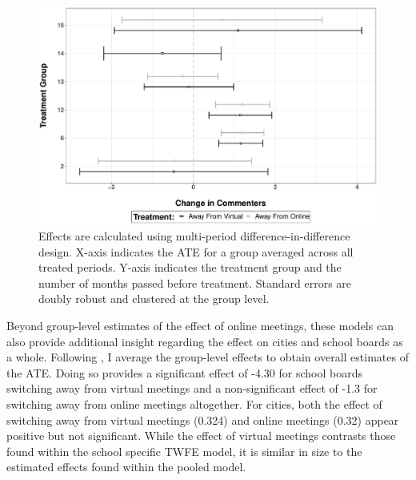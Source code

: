     \begin{figure}[H]
        \centering
         \par\medskip
        \includegraphics[scale=0.39]{Figures/CityMPDID.pdf}
        \caption[Effect of Switching Away From Accessible Meetings By City Groups]{\footnotesize{Effects are calculated using multi-period difference-in-difference design. X-axis indicates the ATE for a group averaged across all treated periods. Y-axis indicates the treatment group and the number of months passed before treatment. Standard errors are doubly robust and clustered at the group level.}}
        \label{fig:AwayCity}
    \end{figure}

    Beyond group-level estimates of the effect of online meetings, these models can also provide additional insight regarding the effect on cities and school boards as a whole. Following \citet{callawayDifferenceinDifferencesMultipleTime2021}, I average the group-level effects to obtain overall estimates of the ATE. Doing so provides a significant effect of -4.30 for school boards switching away from virtual meetings and a non-significant effect of -1.3 for switching away from online meetings altogether. For cities, both the effect of switching away from virtual meetings (0.324) and online meetings (0.32) appear positive but not significant. While the effect of virtual meetings contrasts those found within the school specific TWFE model, it is similar in size to the estimated effects found within the pooled model. 
    
